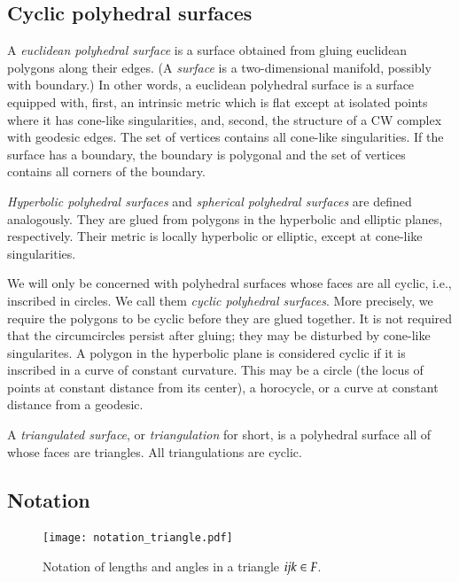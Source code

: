 \documentclass[Thesis]{subfiles}
\begin{document}
\subsection{Cyclic polyhedral surfaces }

A \emph{euclidean polyhedral surface} is a surface obtained from
gluing euclidean polygons along their edges. (A \emph{surface} is a
two-dimensional manifold, possibly with boundary.)  In other words, a
euclidean polyhedral surface is a surface equipped with, first, an
intrinsic metric which is flat except at isolated points where it has
cone-like singularities, and, second, the structure of a CW complex
with geodesic edges. The set of vertices contains all cone-like
singularities. If the surface has a boundary, the boundary is
polygonal and the set of vertices contains all corners of the
boundary.

\emph{Hyperbolic polyhedral surfaces} and \emph{spherical polyhedral
surfaces} are defined analogously. They are glued from polygons in
the hyperbolic and elliptic planes, respectively. Their metric is
locally hyperbolic or elliptic, except at cone-like singularities.

We will only be concerned with polyhedral surfaces whose faces are all
cyclic, i.e., inscribed in circles. We call them \emph{cyclic
polyhedral surfaces}. More precisely, we require the polygons to be
cyclic before they are glued together. It is not required that the
circumcircles persist after gluing; they may be disturbed by cone-like
singularites. A polygon in the hyperbolic plane is considered cyclic
if it is inscribed in a curve of constant curvature. This may be a
circle (the locus of points at constant distance from its center), a
horocycle, or a curve at constant distance from a geodesic.

A \emph{triangulated surface}, or \emph{triangulation} for short, is a
polyhedral surface all of whose faces are triangles.  All
triangulations are cyclic.

\subsection{Notation}

\begin{figure}
\centering
\texttt{[image: notation\_triangle.pdf]}
\caption{Notation of lengths and angles in a triangle $\it ijk \in F$.}
\label{fig:triangle_notation}	
\end{figure}
\end{document}
